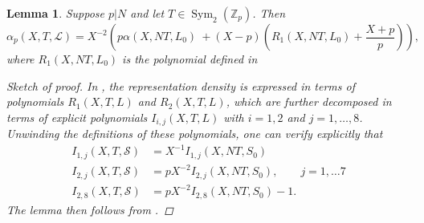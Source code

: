 \documentclass[reqno,oneside]{amsart}
\theoremstyle{plain}
\newtheorem{lemma}[theorem]{Lemma}
\theoremstyle{remark}
\numberwithin{theorem}{section}
\newcommand{\bbZ}{\mathbb Z}
\newcommand{\calL}{\mathcal L}
\newcommand{\calS}{\mathcal S}
\DeclareMathOperator{\Sym}{Sym}
\begin{document}
	\begin{lemma} \label{lem:rep dens relation}
		Suppose $p|N$ and let  $T \in \Sym_2(\bbZ_p)$. Then
		\begin{equation}
		\alpha_p(X, T, \calL) = X^{-2} \left( p \alpha(X, NT, L_0) \ + (X-p) \left( R_1(X, NT, L_0) + \frac{X+p}{p} \right) \right),
		\end{equation}
		where $R_1(X, NT, L_0)$ is the polynomial defined in \cite[Theorem 7.1]{YangLocal}
		
		\begin{proof}[Sketch of proof] In  \cite[\S 7]{YangLocal}, the representation density is expressed in terms of  polynomials $R_1(X, T, L)$ and $R_2(X, T, L)$, which are further decomposed in terms of explicit polynomials $I_{i,j}(X, T, L)$ with $i = 1, 2$ and $j = 1, \dots, 8$.  Unwinding the definitions of these polynomials, one can verify explicitly that
			\begin{align*}
			I_{1,j}(X,T, \calS) & = X^{-1}  I_{1,j}(X, NT, S_0) \\
			I_{2,j}(X, T, \calS) &= p X^{-2} I_{2,j}(X, NT, S_0), \qquad j = 1, \dots 7 \\
			I_{2,8}(X, T, \calS) &= p X^{-2} I_{2,8}(X, NT, S_0) - 1.
			\end{align*}
			The lemma then  follows from \cite[Theorem 7.1]{YangLocal}.
			
		\end{proof}
		
		
	\end{lemma}
	
\end{document}
